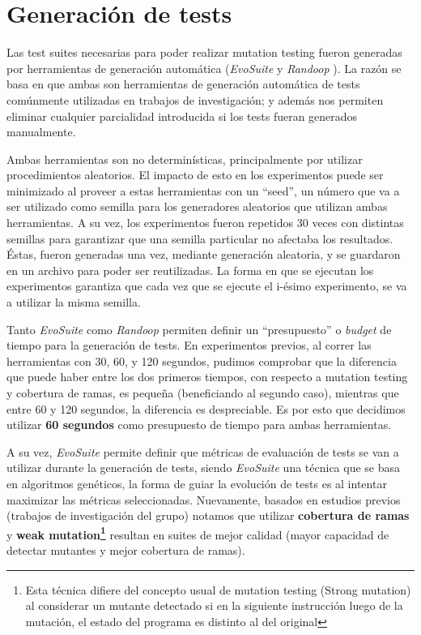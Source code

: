 \section{Generaci\'on de tests}
\label{sec:evaluation.tests}

Las test suites necesarias para poder realizar mutation testing fueron generadas por herramientas de generaci\'on autom\'atica (\emph{EvoSuite} \cite{bibliography.testing.generation.EvoSuiteFraserA11} y \emph{Randoop} \cite{bibliography.testing.generation.RandoopPachecoE07}). La raz\'on se basa en que ambas son herramientas de generaci\'on autom\'atica de tests com\'unmente utilizadas en trabajos de investigaci\'on; y adem\'as nos permiten eliminar cualquier parcialidad introducida si los tests fueran generados manualmente.

Ambas herramientas son no determin\'isticas, principalmente por utilizar procedimientos aleatorios. El impacto de esto en los experimentos puede ser minimizado al proveer a estas herramientas con un ``seed'', un n\'umero que va a ser utilizado como semilla para los generadores aleatorios que utilizan ambas herramientas. A su vez, los experimentos fueron repetidos 30 veces con distintas semillas para garantizar que una semilla particular no afectaba los resultados. \'Estas, fueron generadas una vez, mediante generaci\'on aleatoria, y se guardaron en un archivo para poder ser reutilizadas. La forma en que se ejecutan los experimentos garantiza que cada vez que se ejecute el i-\'esimo experimento, se va a utilizar la misma semilla.

Tanto \emph{EvoSuite} como \emph{Randoop} permiten definir un ``presupuesto'' o \emph{budget} de tiempo para la generaci\'on de tests. En experimentos previos, al correr las herramientas con 30, 60, y 120 segundos, pudimos comprobar que la diferencia que puede haber entre los dos primeros tiempos, con respecto a mutation testing y cobertura de ramas, es peque\~na (beneficiando al segundo caso), mientras que entre 60 y 120 segundos, la diferencia es despreciable. Es por esto que decidimos utilizar \textbf{60 segundos} como presupuesto de tiempo para ambas herramientas.

A su vez, \emph{EvoSuite} permite definir que m\'etricas de evaluaci\'on de tests se van a utilizar durante la generaci\'on de tests, siendo \emph{EvoSuite} una t\'ecnica que se basa en algoritmos gen\'eticos, la forma de guiar la evoluci\'on de tests es al intentar maximizar las m\'etricas seleccionadas. Nuevamente, basados en estudios previos (trabajos de investigaci\'on del grupo) notamos que utilizar \textbf{cobertura de ramas} y \textbf{weak mutation\footnote{Esta t\'ecnica difiere del concepto usual de mutation testing (Strong mutation) al considerar un mutante detectado si en la siguiente instrucci\'on luego de la mutaci\'on, el estado del programa es distinto al del original}} resultan en suites de mejor calidad (mayor capacidad de detectar mutantes y mejor cobertura de ramas).

